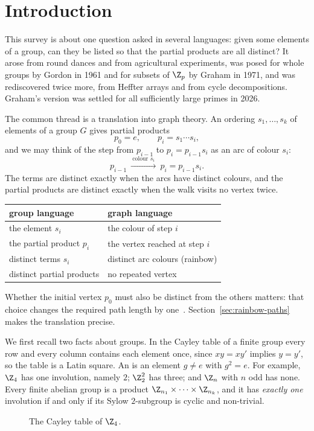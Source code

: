 \section{Introduction}\label{sec:intro}

This survey is about one question asked in several languages: given some elements of a group, can they be listed so that the partial products are all distinct? It arose from round dances and from agricultural experiments, was posed for whole groups by Gordon in 1961 and for subsets of $\Z_p$ by Graham in 1971, and was rediscovered twice more, from Heffter arrays and from cycle decompositions. Graham's version was settled for all sufficiently large primes in 2026.

The common thread is a translation into graph theory. An ordering $s_1,\dots,s_k$ of elements of a group $G$ gives partial products
\[
p_0=e,\qquad p_i=s_1\cdots s_i ,
\]
and we may think of the step from $p_{i-1}$ to $p_i=p_{i-1}s_i$ as an arc of colour $s_i$:
\[
p_{i-1}\ \xrightarrow{\ \text{colour }s_i\ }\ p_i=p_{i-1}s_i.
\]
The terms are distinct exactly when the arcs have distinct colours, and the partial products are distinct exactly when the walk visits no vertex twice.

\begin{center}
\renewcommand{\arraystretch}{1.35}
\begin{tabular}{ll}
\textbf{group language} & \textbf{graph language}\\\hline
the element $s_i$ & the colour of step $i$\\
the partial product $p_i$ & the vertex reached at step $i$\\
distinct terms $s_i$ & distinct arc colours (rainbow)\\
distinct partial products & no repeated vertex
\end{tabular}
\end{center}

Whether the initial vertex $p_0$ must also be distinct from the others matters: that choice changes the required path length by one~\cite[\S1]{bfmpy25}. Section~\ref{sec:rainbow-paths} makes the translation precise.

We first recall two facts about groups. In the Cayley table of a finite group every row and every column contains each element once, since $xy=xy'$ implies $y=y'$, so the table is a Latin square. An  is an element $g\neq e$ with $g^2=e$. For example, $\Z_4$ has one involution, namely $2$; $\Z_2^2$ has three; and $\Z_n$ with $n$ odd has none. Every finite abelian group is a product $\Z_{n_1}\times\dots\times\Z_{n_k}$, and it has \emph{exactly one} involution if and only if its Sylow $2$-subgroup is cyclic and non-trivial.

\begin{figure}[ht]
\centering

\caption{The Cayley table of $\Z_4$.}
\label{fig:z4-table}
\end{figure}
